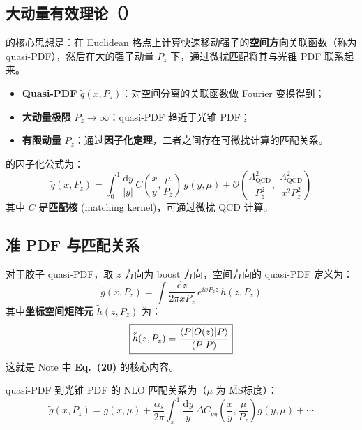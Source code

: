 \documentclass[11pt,a4paper]{ctexart}
\newcommand{\LaMET}{\text{LaMET}}
\newcommand{\MSbar}{$\overline{\text{MS}}$}
\newcommand{\order}[1]{\mathcal{O}(#1)}
\begin{document}
\subsection{大动量有效理论（\LaMET）}

\LaMET{}的核心思想是：在 Euclidean 格点上计算快速移动强子的\textbf{空间方向}关联函数（称为 quasi-PDF），然后在大的强子动量 $P_z$ 下，通过微扰匹配将其与光锥 PDF 联系起来。

\begin{itemize}
  \item \textbf{Quasi-PDF} $\tilde{q}(x, P_z)$：对空间分离的关联函数做 Fourier 变换得到；
  \item \textbf{大动量极限} $P_z \to \infty$：quasi-PDF 趋近于光锥 PDF；
  \item \textbf{有限动量} $P_z$：通过\textbf{因子化定理}，二者之间存在可微扰计算的匹配关系。
\end{itemize}

\LaMET{}的因子化公式为：
\begin{equation}\label{eq:lamet_factorization}
\tilde{q}(x, P_z) = \int_{0}^{1} \frac{\mathrm{d}y}{|y|} \,
C\!\left(\frac{x}{y}, \frac{\mu}{P_z}\right) \,
g(y, \mu) + \order{\frac{\Lambda_{\text{QCD}}^{2}}{P_z^{2}},\;
\frac{\Lambda_{\text{QCD}}^{2}}{x^{2}P_z^{2}}}
\end{equation}
其中 $C$ 是\textbf{匹配核} (matching kernel)，可通过微扰 QCD 计算。

\subsection{准 PDF 与匹配关系}

对于胶子 quasi-PDF，取 $z$ 方向为 boost 方向，空间方向的 quasi-PDF 定义为：
\begin{equation}\label{eq:quasi_pdf_def}
\tilde{g}(x, P_z) = \int \frac{\mathrm{d}z}{2\pi x P_z} \,
e^{i x P_z z} \, \tilde{h}(z, P_z)
\end{equation}
其中\textbf{坐标空间矩阵元} $\tilde{h}(z, P_z)$ 为：
\begin{equation}\label{eq:matrix_element}
\boxed{\tilde{h}(z, P_z) = \frac{\braket{P | O(z) | P}}{\braket{P|P}}}
\end{equation}
这就是 Note 中 \textbf{Eq.~(20)} 的核心内容。

quasi-PDF 到光锥 PDF 的 NLO 匹配关系为（$\mu$ 为 \MSbar{}标度）：
\begin{equation}
\tilde{g}(x, P_z) = g(x, \mu) + \frac{\alpha_s}{2\pi}
\int_{x}^{1} \frac{\mathrm{d}y}{y} \,
\Delta C_{gg}\!\left(\frac{x}{y}, \frac{\mu}{P_z}\right) g(y, \mu) + \cdots
\end{equation}
\end{document}
